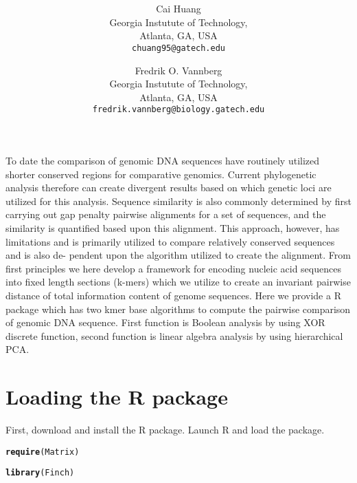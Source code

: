 \documentclass{article}\usepackage[]{graphicx}\usepackage[]{color}
\title{}
\title{\textsf{\textbf{\thetitle}}}
\author{
	Cai Huang\\[1em]Georgia Instutute of Technology,\\ Atlanta, GA, USA\\ \texttt{chuang95@gatech.edu}
	\and
	Fredrik O. Vannberg\\[1em]Georgia Instutute of Technology,\\ Atlanta, GA, USA\\ \texttt{fredrik.vannberg@biology.gatech.edu}
}
\makeatletter
\newcommand{\hlstd}[1]{\textcolor[rgb]{0.345,0.345,0.345}{#1}}%
\newcommand{\hlkwd}[1]{\textcolor[rgb]{0.737,0.353,0.396}{\textbf{#1}}}%
\newenvironment{kframe}{%
 \def\at@end@of@kframe{}%
 \ifinner\ifhmode%
  \def\at@end@of@kframe{\end{minipage}}%
  \begin{minipage}{\columnwidth}%
 \fi\fi%
 \def\FrameCommand##1{\hskip\@totalleftmargin \hskip-\fboxsep
 \colorbox{shadecolor}{##1}\hskip-\fboxsep
     \hskip-\linewidth \hskip-\@totalleftmargin \hskip\columnwidth}%
 \MakeFramed {\advance\hsize-\width
   \@totalleftmargin\z@ \linewidth\hsize
   \@setminipage}}%
 {\par\unskip\endMakeFramed%
 \at@end@of@kframe}
\newenvironment{knitrout}{}{} %
\makeatother
\begin{document}
\maketitle


\abstract

To date the comparison of genomic DNA sequences have routinely utilized shorter conserved regions for comparative genomics. Current phylogenetic analysis therefore can create divergent results based on which genetic loci are utilized for this analysis. Sequence similarity is also commonly determined by first carrying out gap penalty pairwise alignments for a set of sequences, and the similarity is quantified based upon this alignment. This approach, however, has limitations and is primarily utilized to compare relatively conserved sequences and is also de- pendent upon the algorithm utilized to create the alignment. From first principles we here develop a framework for encoding nucleic acid sequences into fixed length sections (k-mers) which we utilize to create an invariant pairwise distance of total information content of genome sequences. Here we provide a R package which has two kmer base algorithms to compute the pairwise comparison of genomic DNA sequence. First function is Boolean analysis by using XOR discrete function, second function is linear algebra analysis by using hierarchical PCA.


\tableofcontents


\section{Loading the R package}
\label{sec.loading}

First, download and install the  R package. Launch R and load the package.

\begin{knitrout}
\color{fgcolor}\begin{kframe}
\begin{alltt}
\hlkwd{require}\hlstd{(Matrix)}
\end{alltt}


{\ttfamily\noindent\itshape\color{messagecolor}{\#\# Loading required package: Matrix\\\#\# Loading required package: methods}}\begin{alltt}
\hlkwd{library}\hlstd{(Finch)}
\end{alltt}
\end{kframe}
\end{knitrout}
\end{document}
